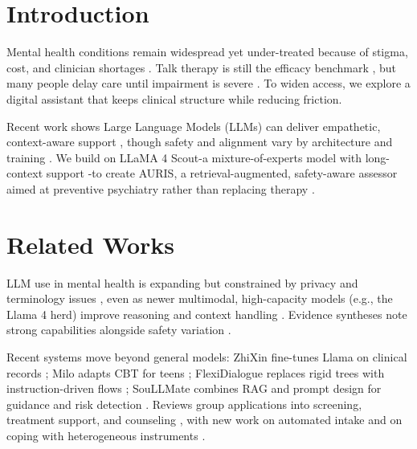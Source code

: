 ﻿\documentclass[acmsmall,screen]{acmart}
\begin{document}

\maketitle

\section{Introduction}

Mental health conditions remain widespread yet under-treated because of stigma, cost, and clinician shortages \cite{1,2}. Talk therapy is still the efficacy benchmark \cite{3,21}, but many people delay care until impairment is severe \cite{2}. To widen access, we explore a digital assistant that keeps clinical structure while reducing friction.

Recent work shows Large Language Models (LLMs) can deliver empathetic, context-aware support \cite{4,5,6,7}, though safety and alignment vary by architecture and training \cite{8}. We build on LLaMA 4 Scout-a mixture-of-experts model with long-context support \cite{9,10,11}-to create AURIS, a retrieval-augmented, safety-aware assessor aimed at preventive psychiatry rather than replacing therapy \cite{1,22}.

\section{Related Works}

LLM use in mental health is expanding but constrained by privacy and terminology issues \cite{12}, even as newer multimodal, high-capacity models (e.g., the Llama 4 herd) improve reasoning and context handling \cite{11}. Evidence syntheses note strong capabilities alongside safety variation \cite{4,5,6,7,8,20}.

Recent systems move beyond general models: ZhiXin fine-tunes Llama on clinical records \cite{12}; Milo adapts CBT for teens \cite{13}; FlexiDialogue replaces rigid trees with instruction-driven flows \cite{14}; SouLLMate combines RAG and prompt design for guidance and risk detection \cite{15}. Reviews group applications into screening, treatment support, and counseling \cite{5}, with new work on automated intake \cite{16} and on coping with heterogeneous instruments \cite{17}.
\end{document}
